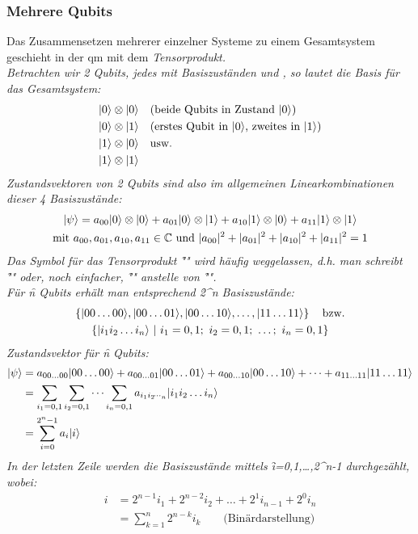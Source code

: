 \subsubsection*{Mehrere Qubits}
Das Zusammensetzen mehrerer einzelner Systeme zu einem Gesamtsystem geschieht in der \ac{qm} mit dem \it{Tensorprodukt}.\\
Betrachten wir 2 Qubits, jedes mit Basiszuständen  und , so lautet die Basis für das Gesamtsystem:
\begin{align*}
    |0\rangle &\otimes |0\rangle\quad\text{(beide Qubits in Zustand ${|0\rangle}$)}\\
    |0\rangle &\otimes |1\rangle\quad\text{(erstes Qubit in ${|0\rangle}$, zweites in ${|1\rangle}$)}\\
    |1\rangle &\otimes |0\rangle\quad\text{usw.}\\
    |1\rangle &\otimes |1\rangle
\end{align*}
Zustandsvektoren von 2 Qubits sind also im allgemeinen Linearkombinationen dieser 4 Basiszustände:
\begin{gather*}
    |\psi\rangle=a_{00}|0\rangle\otimes|0\rangle+a_{01}|0\rangle\otimes|1\rangle+a_{10}|1\rangle\otimes|0\rangle+a_{11}|1\rangle\otimes|1\rangle\\
    \text{mit }a_{00},a_{01},a_{10},a_{11}\in\mathbb{C}\text{ und }|a_{00}|^2+|a_{01}|^2+|a_{10}|^2+|a_{11}|^2=1
\end{gather*}
Das Symbol für das Tensorprodukt "\f{\otimes}" wird häufig weggelassen, d.h. man schreibt "\f{}" oder, noch einfacher, "\f{}" anstelle von "\f{\otimes{}}".\\
Für \f{n} Qubits erhält man entsprechend \f{2^n} Basiszustände:
\begin{gather*}
    \left\{\cket{00\dots00},\cket{00\dots01},\cket{00\dots10},\dots,\cket{11\dots11}\right\}\quad\text{bzw.}\\
    \left\{\cket{i_1i_2\dots i_n}\ |\ i_1=0,1;\ i_2=0,1;\ \dots;\ i_n=0,1\right\}
\end{gather*}
Zustandsvektor für \f{n} Qubits:
\begin{align*}
    |\psi\rangle &= a_{00\dots00}|00\dots00\rangle + a_{00\dots01}|00\dots01\rangle + a_{00\dots10}|00\dots10\rangle+\dots+a_{11\dots11}|11\dots11\rangle\\
    &= \sum_{i_1=0,1}\sum_{i_2=0,1}\dots\sum_{i_n=0,1}a_{i_1i_2\dotsi_n}|i_1i_2\dots i_n\rangle\\
    &= \sum_{i=0}^{2^n-1}a_i|i\rangle
\end{align*}
In der letzten Zeile werden die Basiszustände mittels \f{i=0,1,\dots,2^n-1} durchgezählt, wobei:
\begin{align*}
    i &= 2^{n-1}i_1+2^{n-2}i_2+\dots+2^{1}i_{n-1}+2^0i_n\\
    &= \sum_{k=1}^{n}2^{n-k}i_k\qquad\text{(Binärdarstellung)}
\end{align*}
